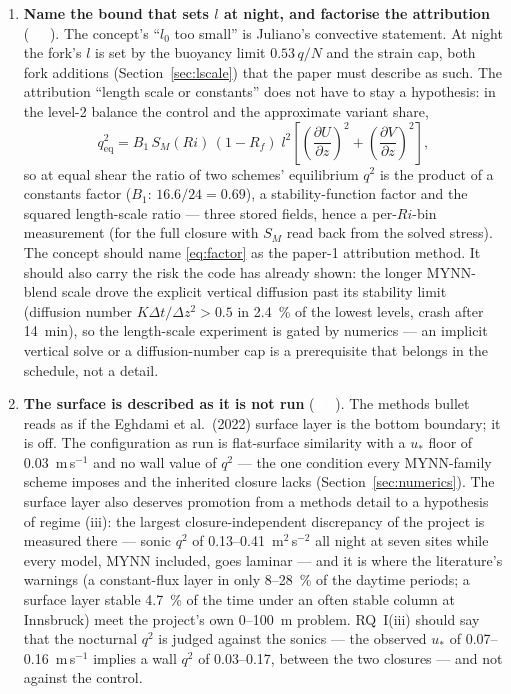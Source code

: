 \documentclass[10pt,a4paper]{article}
\newcommand{\keytag}[1]{\colorbox{keyc}{\textcolor{white}{\sffamily\bfseries\scriptsize K#1}}}
\newcommand{\pd}[2]{\frac{\partial #1}{\partial #2}}
\begin{document}
\begin{enumerate}
\item \textbf{Name the bound that sets $l$ at night, and factorise the attribution} (\keytag{3}). The concept's ``$l_0$ too small'' is Juliano's convective statement. At night the fork's $l$ is set by the buoyancy limit $0.53\,q/N$ and the strain cap, both fork additions (Section~\ref{sec:lscale}) that the paper must describe as such. The attribution ``length scale or constants'' does not have to stay a hypothesis: in the level-2 balance the control and the approximate variant share,
\begin{equation}
q^2_{\mathrm{eq}} = B_1\, S_M(Ri)\,(1 - R_f)\; l^2 \left[\left(\pd{U}{z}\right)^{\!2} + \left(\pd{V}{z}\right)^{\!2}\right],
\label{eq:factor}
\end{equation}
so at equal shear the ratio of two schemes' equilibrium $q^2$ is the product of a constants factor ($B_1$: $16.6/24 = 0.69$), a stability-function factor and the squared length-scale ratio — three stored fields, hence a per-$Ri$-bin measurement (for the full closure with $S_M$ read back from the solved stress). The concept should name \eqref{eq:factor} as the paper-1 attribution method. It should also carry the risk the code has already shown: the longer MYNN-blend scale drove the explicit vertical diffusion past its stability limit (diffusion number $K\Delta t/\Delta z^2 > 0.5$ in 2.4~\% of the lowest levels, crash after 14~min), so the length-scale experiment is gated by numerics — an implicit vertical solve or a diffusion-number cap is a prerequisite that belongs in the schedule, not a detail.

\item \textbf{The surface is described as it is not run} (\keytag{8}). The methods bullet reads as if the Eghdami et al.\ (2022) surface layer is the bottom boundary; it is off. The configuration as run is flat-surface similarity with a $u_*$ floor of 0.03~m\,s$^{-1}$ and no wall value of $q^2$ — the one condition every MYNN-family scheme imposes and the inherited closure lacks (Section~\ref{sec:numerics}). The surface layer also deserves promotion from a methods detail to a hypothesis of regime (iii): the largest closure-independent discrepancy of the project is measured there — sonic $q^2$ of 0.13--0.41~m$^2$\,s$^{-2}$ all night at seven sites while every model, MYNN included, goes laminar — and it is where the literature's warnings (a constant-flux layer in only 8--28~\% of the daytime periods; a surface layer stable 4.7~\% of the time under an often stable column at Innsbruck) meet the project's own 0--100~m problem. RQ~I(iii) should say that the nocturnal $q^2$ is judged against the sonics — the observed $u_*$ of 0.07--0.16~m\,s$^{-1}$ implies a wall $q^2$ of 0.03--0.17, between the two closures — and not against the control.


\end{enumerate}
\end{document}

